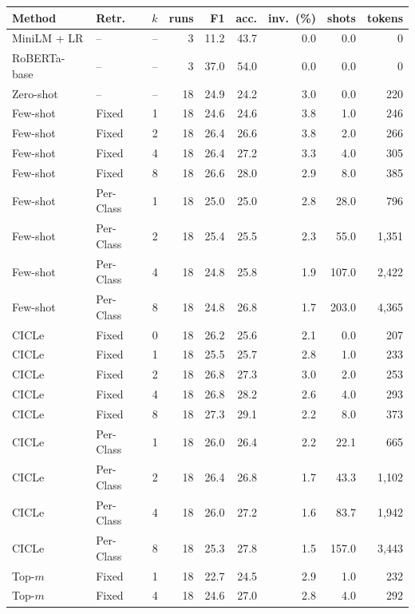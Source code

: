 \begin{tabular}{llrrrrrrr}
\toprule
Method & Retr. & $k$ & runs & F1 & acc. & inv.\ (\%) & shots & tokens \\
\midrule
MiniLM + LR & -- & -- & 3 & 11.2 & 43.7 & 0.0 & 0.0 & 0 \\
RoBERTa-base & -- & -- & 3 & 37.0 & 54.0 & 0.0 & 0.0 & 0 \\
\midrule
Zero-shot & -- & -- & 18 & 24.9 & 24.2 & 3.0 & 0.0 & 220 \\
\midrule
Few-shot & Fixed & 1 & 18 & 24.6 & 24.6 & 3.8 & 1.0 & 246 \\
Few-shot & Fixed & 2 & 18 & 26.4 & 26.6 & 3.8 & 2.0 & 266 \\
Few-shot & Fixed & 4 & 18 & 26.4 & 27.2 & 3.3 & 4.0 & 305 \\
Few-shot & Fixed & 8 & 18 & 26.6 & 28.0 & 2.9 & 8.0 & 385 \\
Few-shot & Per-Class & 1 & 18 & 25.0 & 25.0 & 2.8 & 28.0 & 796 \\
Few-shot & Per-Class & 2 & 18 & 25.4 & 25.5 & 2.3 & 55.0 & 1,351 \\
Few-shot & Per-Class & 4 & 18 & 24.8 & 25.8 & 1.9 & 107.0 & 2,422 \\
Few-shot & Per-Class & 8 & 18 & 24.8 & 26.8 & 1.7 & 203.0 & 4,365 \\
CICLe & Fixed & 0 & 18 & 26.2 & 25.6 & 2.1 & 0.0 & 207 \\
CICLe & Fixed & 1 & 18 & 25.5 & 25.7 & 2.8 & 1.0 & 233 \\
CICLe & Fixed & 2 & 18 & 26.8 & 27.3 & 3.0 & 2.0 & 253 \\
CICLe & Fixed & 4 & 18 & 26.8 & 28.2 & 2.6 & 4.0 & 293 \\
CICLe & Fixed & 8 & 18 & 27.3 & 29.1 & 2.2 & 8.0 & 373 \\
CICLe & Per-Class & 1 & 18 & 26.0 & 26.4 & 2.2 & 22.1 & 665 \\
CICLe & Per-Class & 2 & 18 & 26.4 & 26.8 & 1.7 & 43.3 & 1,102 \\
CICLe & Per-Class & 4 & 18 & 26.0 & 27.2 & 1.6 & 83.7 & 1,942 \\
CICLe & Per-Class & 8 & 18 & 25.3 & 27.8 & 1.5 & 157.0 & 3,443 \\
\midrule
Top-$m$ & Fixed & 1 & 18 & 22.7 & 24.5 & 2.9 & 1.0 & 232 \\
Top-$m$ & Fixed & 4 & 18 & 24.6 & 27.0 & 2.8 & 4.0 & 292 \\

\end{tabular}
